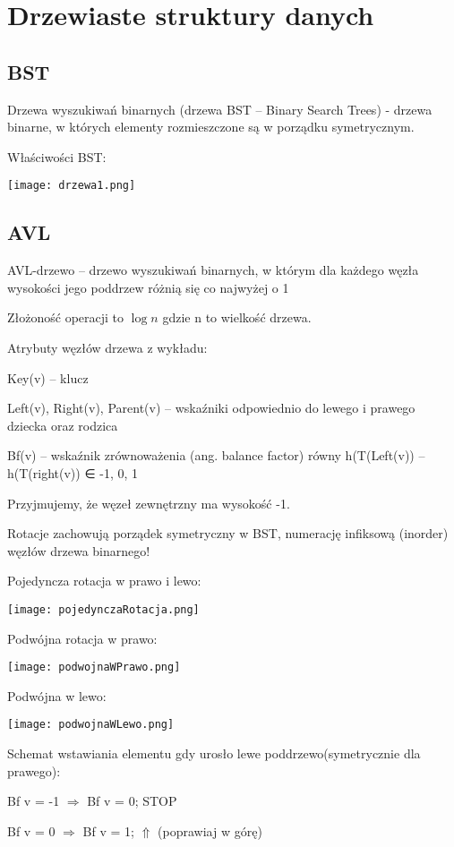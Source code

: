 \section{Drzewiaste struktury danych}
\subsection{BST}
\entry
Drzewa wyszukiwań binarnych (drzewa BST – Binary Search Trees) - drzewa binarne, w których elementy
rozmieszczone są w porządku symetrycznym.

\entry
Właściwości BST:  

\texttt{[image: drzewa1.png]}

\subsection{AVL}
\entry
AVL-drzewo – drzewo wyszukiwań binarnych, w którym dla każdego węzła wysokości jego poddrzew
różnią się co najwyżej o 1

\entry
Złożoność operacji to $\log{n}$ gdzie n to wielkość drzewa.

\entry 
Atrybuty węzłów drzewa z wykładu:  

Key(v) – klucz  

Left(v), Right(v), Parent(v) – wskaźniki odpowiednio do lewego i prawego dziecka oraz rodzica  

Bf(v) – wskaźnik zrównoważenia (ang. balance factor) równy h(T(Left(v)) – h(T(right(v)) ∈ {-1, 0, 1}

\entry
Przyjmujemy, że węzeł zewnętrzny ma wysokość -1.

\entry
Rotacje zachowują porządek symetryczny w BST, numerację infiksową (inorder) węzłów drzewa binarnego!

\entry
Pojedyncza rotacja w prawo i lewo:  

\texttt{[image: pojedynczaRotacja.png]}

\entry
Podwójna rotacja w prawo:  

\texttt{[image: podwojnaWPrawo.png]}

\entry
Podwójna w lewo:

\texttt{[image: podwojnaWLewo.png]}

\entry
Schemat wstawiania elementu gdy urosło lewe poddrzewo(symetrycznie dla prawego):

Bf v = -1 $\Rightarrow$ Bf v = 0; STOP

Bf v = 0 $\Rightarrow$ Bf v = 1; $\Uparrow$ (poprawiaj w górę)

